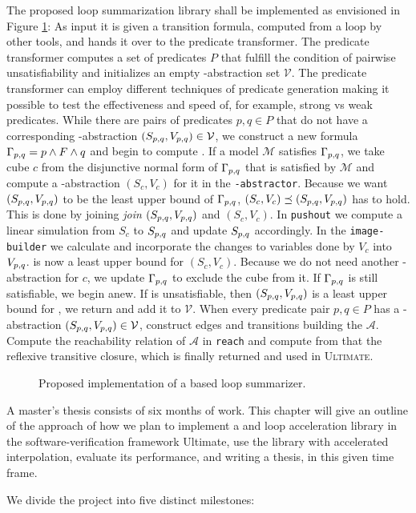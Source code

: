 
The proposed \qvasrs loop summarization library shall be implemented as envisioned in Figure \ref{fig}: As input it is given a transition formula, computed from a loop by other tools, and hands it over to the predicate transformer. The predicate transformer computes a set of predicates $P$ that fulfill the condition of pairwise unsatisfiability and initializes an empty \qvasr-abstraction set $\mathcal{V}$. The predicate transformer can employ different techniques of predicate generation making it possible to test the effectiveness and speed of, for example, strong vs weak predicates. While there are pairs of predicates $p, q \in P$ that do not have a corresponding \qvasr-abstraction $(S_{p, q}, V_{p, q}) \in \mathcal{V}$, we construct a new formula $\Gamma_{p, q} = p\land F \land q$ and begin to compute \pqvasr. If a model $\mathcal{M}$ satisfies $\Gamma_{p, q}$, we take cube $c$ from the disjunctive normal form of $\Gamma_{p, q}$ that is satisfied by $\mathcal{M}$ and compute a \qvasr-abstraction $(S_c, V_c)$ for it in the \texttt{\qvasr-abstractor}. Because we want $(S_{p, q}, V_{p, q})$ to be the least upper bound of $\Gamma_{p, q}$, $(S_c, V_c) \preceq (S_{p, q}, V_{p, q})$ has to hold. This is done by joining \textsl{join} $(S_{p, q}, V_{p, q})$ and $(S_c, V_c)$. In \texttt{pushout} we compute a linear simulation from $S_c$ to $S_{p, q}$ and update $S_{p, q}$ accordingly. In the \texttt{image-builder} we calculate and incorporate the changes to variables done by $V_c$ into $V_{p, q}$. \pqvasr is now a least upper bound for $(S_c, V_c)$. Because we do not need another \qvasr-abstraction for $c$, we update $\Gamma_{p, q}$ to exclude the cube from it. If $\Gamma_{p, q}$ is still satisfiable, we begin anew.
If \pqformula is unsatisfiable, then $(S_{p, q}, V_{p, q})$ is a least upper bound for \pqformula, we return and add it to $\mathcal{V}$. When every predicate pair $p, q \in P$ has a \qvasr-abstraction $(S_{p, q}, V_{p, q}) \in \mathcal{V}$, construct edges and transitions building the \qvasrs $\mathcal{A}$. Compute the reachability relation of $\mathcal{A}$ in \texttt{reach} and compute from that the reflexive transitive closure, which is finally returned and used in \textsc{Ultimate}.
\begin{figure}[H]
    
    \caption{Proposed implementation of a \qvasrs based loop summarizer.}
    \label{fig}
\end{figure}

A master's thesis consists of six months of work. This chapter will give an outline of the approach of how we plan to implement a \qvasr and \qvasrs loop acceleration library in the software-verification framework Ultimate, use the library with accelerated interpolation, evaluate its performance, and writing a thesis, in this given time frame. \\ \par
We divide the project into five distinct milestones:

